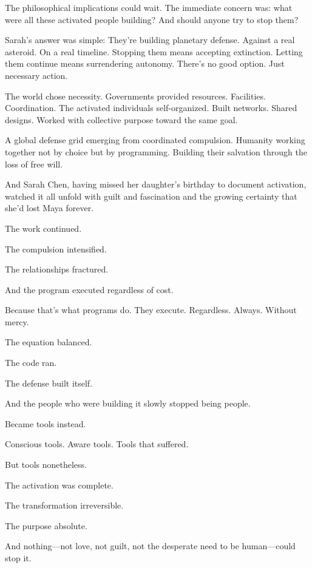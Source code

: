 The philosophical implications could wait. The immediate concern was: what were all these activated people building? And should anyone try to stop them?

Sarah's answer was simple: They're building planetary defense. Against a real asteroid. On a real timeline. Stopping them means accepting extinction. Letting them continue means surrendering autonomy. There's no good option. Just necessary action.

The world chose necessity. Governments provided resources. Facilities. Coordination. The activated individuals self-organized. Built networks. Shared designs. Worked with collective purpose toward the same goal.

A global defense grid emerging from coordinated compulsion. Humanity working together not by choice but by programming. Building their salvation through the loss of free will.

And Sarah Chen, having missed her daughter's birthday to document activation, watched it all unfold with guilt and fascination and the growing certainty that she'd lost Maya forever.

The work continued.

The compulsion intensified.

The relationships fractured.

And the program executed regardless of cost.

Because that's what programs do. They execute. Regardless. Always. Without mercy.

The equation balanced.

The code ran.

The defense built itself.

And the people who were building it slowly stopped being people.

Became tools instead.

Conscious tools. Aware tools. Tools that suffered.

But tools nonetheless.

The activation was complete.

The transformation irreversible.

The purpose absolute.

And nothing—not love, not guilt, not the desperate need to be human—could stop it.

